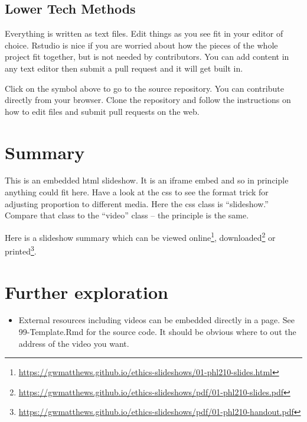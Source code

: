 \documentclass[
  12pt, openany]{book}
\makeatletter
\providecommand{\tightlist}{%
  \setlength{\itemsep}{0pt}\setlength{\parskip}{0pt}}
\renewcommand{\href}[2]{#2\footnote{\url{#1}}}
\newenvironment{kframe}{%
\medskip{}
\setlength{\fboxsep}{.8em}
 \def\at@end@of@kframe{}%
 \ifinner\ifhmode%
  \def\at@end@of@kframe{\end{minipage}}%
  \begin{minipage}{\columnwidth}%
 \fi\fi%
 \def\FrameCommand##1{\hskip\@totalleftmargin \hskip-\fboxsep
 \colorbox{shadecolor}{##1}\hskip-\fboxsep
     \hskip-\linewidth \hskip-\@totalleftmargin \hskip\columnwidth}%
 \MakeFramed {\advance\hsize-\width
   \@totalleftmargin\z@ \linewidth\hsize
   \@setminipage}}%
 {\par\unskip\endMakeFramed%
 \at@end@of@kframe}
\newenvironment{rmdblock}[1]
  {
  \begin{itemize}
  \renewcommand{\labelitemi}{
    \raisebox{-.7\height}[0pt][0pt]{
      {\setkeys{Gin}{width=3em,keepaspectratio}\texttt{[image: img/\#1]}}
    }
  }
  \setlength{\fboxsep}{1em}
  \begin{kframe}
  \item
  }
  {
  \end{kframe}
  \end{itemize}
  }
\newenvironment{important}
  {\begin{rmdblock}{important}}
  {\end{rmdblock}}
\newenvironment{slideshow}{}
\makeatother
\begin{document}
\hypertarget{lower-tech-methods}{%
\subsection{Lower Tech Methods}\label{lower-tech-methods}}

Everything is written as text files. Edit things as you see fit in your editor of choice. Rstudio is nice if you are worried about how the pieces of the whole project fit together, but is not needed by contributors. You can add content in any text editor then submit a pull request and it will get built in.

\begin{important}

Click on the symbol above to go to the source repository. You can contribute directly from your browser. Clone the repository and follow the instructions on how to edit files and submit pull requests on the web.

\end{important}

\hypertarget{summary}{%
\section*{Summary}\label{summary}}


This is an embedded html slideshow. It is an iframe embed and so in principle anything could fit here. Have a look at the css to see the format trick for adjusting proportion to different media. Here the css class is ``slideshow.'' Compare that class to the ``video'' class -- the principle is the same.

\begin{slideshow}Here is a slideshow summary which can be \href{https://gwmatthews.github.io/ethics-slideshows/01-phl210-slides.html}{viewed online}, \href{https://gwmatthews.github.io/ethics-slideshows/pdf/01-phl210-slides.pdf}{downloaded} or \href{https://gwmatthews.github.io/ethics-slideshows/pdf/01-phl210-handout.pdf}{printed}.

\end{slideshow}

\hypertarget{further-exploration}{%
\section*{Further exploration}\label{further-exploration}}


\begin{itemize}
\tightlist
\item
  External resources including videos can be embedded directly in a page. See 99-Template.Rmd for the source code. It should be obvious where to out the address of the video you want.
\end{itemize}
\end{document}
